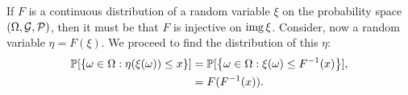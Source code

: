 \begin{problem}{15}
\end{problem}
\begin{solution}
    If $F$ is a continuous distribution of a random variable $\xi$ on the probability space $(\Omega, \mathcal{G}, \mathcal{P})$, then it must be that $F$ is injective on $\operatorname{img} \xi$. Consider, now a random variable $\eta = F(\xi)$. We proceed to find the distribution of this $\eta$:
    \begin{align*}
        \mathbb{P}[\left\{ \omega \in \Omega: \eta(\xi(\omega)) \leq x \right\}] &= \mathbb{P}[\left\{ \omega \in \Omega: \xi(\omega) \leq F^{-1}(x) \right\}], \\
        &= F(F^{-1}(x)).
    \end{align*}
\end{solution}